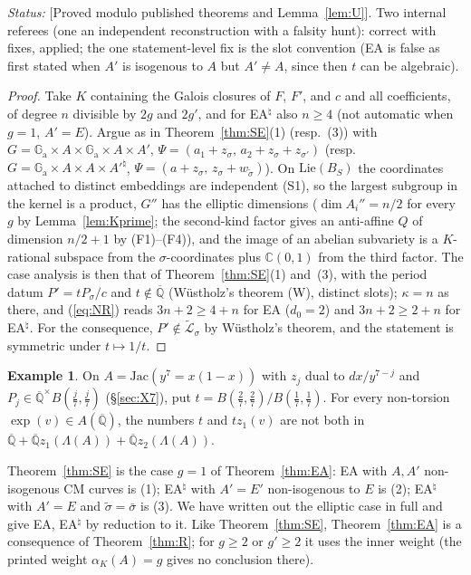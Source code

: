 \documentclass[11pt]{amsart}
\theoremstyle{definition}
\newtheorem{example}[theorem]{Example}
\newcommand{\Qb}{\overline{\mathbb{Q}}}
\newcommand{\C}{\mathbb{C}}
\newcommand{\Ga}{\mathbb{G}_{\mathrm a}}
\newcommand{\Lt}{\widetilde{\mathcal{L}}}
\newcommand{\lab}[1]{\textup{[#1]}}
\newcommand{\LabC}{\lab{Proved modulo published theorems and Lemma~\ref{lem:U}}}
\newcommand{\Status}{\noindent\emph{Status:} }
\begin{document}
\Status \LabC. Two internal referees (one an independent reconstruction with a falsity
hunt): correct with fixes, applied; the one statement-level fix is the slot convention (EA is false as first stated when
$A'$ is isogenous to $A$ but $A'\ne A$, since then $t$ can be algebraic).

\begin{proof}
Take $K$ containing the Galois closures of $F$, $F'$, and $c$ and all coefficients, of degree $n$ divisible by $2g$ and
$2g'$, and for EA$^\natural$ also $n\ge4$ (not automatic when $g=1$, $A'=E$). Argue as in Theorem~\ref{thm:SE}(1) (resp.\
(3)) with $G=\Ga\times A\times\Ga\times A\times A'$, $\Psi=(a_1+z_\sigma,\,a_2+z_\sigma+z_{\sigma'})$ (resp.\
$G=\Ga\times A\times A\times A'^\natural$, $\Psi=(a+z_\sigma,\,z_\sigma+w_{\tilde\sigma})$). On $\mathrm{Lie}(B_S)$ the
coordinates attached to distinct embeddings are independent (S1), so the largest subgroup in the kernel is a product, $G''$
has the elliptic dimensions ($\dim A_i''=n/2$ for every $g$ by Lemma~\ref{lem:Kprime}; the second-kind factor gives an
anti-affine $Q$ of dimension $n/2+1$ by (F1)--(F4)), and the image of an abelian subvariety is a $K$-rational subspace from
the $\sigma$-coordinates plus $\C(0,1)$ from the third factor. The case analysis is then that of Theorem~\ref{thm:SE}(1)
and~(3), with the period datum $P'=tP_\sigma/c$ and $t\notin\Qb$ (W\"ustholz's theorem (W), distinct slots); $\kappa=n$ as
there, and (\ref{eq:NR}) reads $3n+2\ge4+n$ for EA ($d_0=2$) and $3n+2\ge2+n$ for EA$^\natural$. For the consequence,
$P'\notin\Lt_\sigma$ by W\"ustholz's theorem, and the statement is symmetric under $t\mapsto1/t$.
\end{proof}

\begin{example}
On $A=\mathrm{Jac}(y^7=x(1-x))$ with $z_j$ dual to $dx/y^{7-j}$ and $P_j\in\Qb^\times B(\frac j7,\frac j7)$
(\S\ref{sec:X7}), put $t=B(\frac27,\frac27)/B(\frac17,\frac17)$. For every non-torsion $\exp(v)\in A(\Qb)$, the numbers $t$
and $tz_1(v)$ are not both in $\Qb+\Qb z_1(\Lambda(A))+\Qb z_2(\Lambda(A))$.
\end{example}

\noindent Theorem~\ref{thm:SE} is the case $g=1$ of Theorem~\ref{thm:EA}: EA with $A,A'$ non-isogenous CM curves is (1);
EA$^\natural$ with $A'=E'$ non-isogenous to $E$ is (2); EA$^\natural$ with $A'=E$ and $\tilde\sigma=\bar\sigma$ is (3). We
have written out the elliptic case in full and give EA, EA$^\natural$ by reduction to it. Like Theorem~\ref{thm:SE}, Theorem~\ref{thm:EA} is
a consequence of Theorem~\ref{thm:R}; for $g\ge2$ or $g'\ge2$ it uses the inner weight (the printed weight $\alpha_K(A)=g$
gives no conclusion there).
\end{document}
